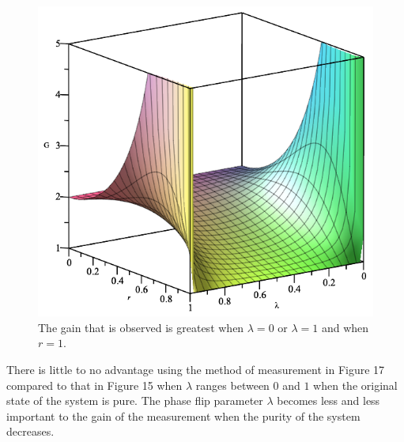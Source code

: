 \documentclass[twocolumn]{article}
\begin{document}
\begin{figure}[h]
\begin{center}
\includegraphics[width=0.65\linewidth]{Phase-Flip-One-Channel-Lambda-and-r-Gain.png}
\caption{The gain that is observed is greatest when $\lambda=0$ or $\lambda=1$ and when $r=1$.}
\end{center}
\end{figure}
There is little to no advantage using the method of measurement in Figure 17 compared to that in Figure 15 when $\lambda$ ranges between $0$ and $1$ when the original state of the system is pure. The phase flip parameter $\lambda$ becomes less and less important to the gain of the measurement when the purity of the system decreases.
\end{document}

